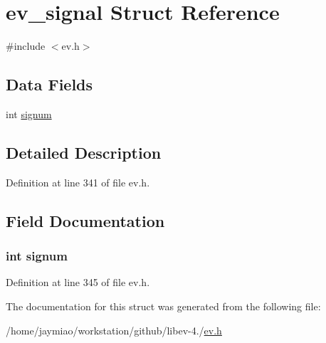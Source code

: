 \hypertarget{structev__signal}{\section{ev\-\_\-signal \-Struct \-Reference}
\label{structev__signal}
}


{\ttfamily \#include $<$ev.\-h$>$}

\subsection*{\-Data \-Fields}
\begin{DoxyCompactItemize}
\item 
int \hyperlink{structev__signal_af063222f46f5e774717f2f0a077302af}{signum}
\end{DoxyCompactItemize}


\subsection{\-Detailed \-Description}


\-Definition at line 341 of file ev.\-h.



\subsection{\-Field \-Documentation}
\hypertarget{structev__signal_af063222f46f5e774717f2f0a077302af}{
\subsubsection[{signum}]{\setlength{\rightskip}{0pt plus 5cm}int {\bf signum}}}\label{structev__signal_af063222f46f5e774717f2f0a077302af}


\-Definition at line 345 of file ev.\-h.



\-The documentation for this struct was generated from the following file\-:\begin{DoxyCompactItemize}
\item 
/home/jaymiao/workstation/github/libev-\/4./\hyperlink{ev_8h}{ev.\-h}\end{DoxyCompactItemize}
